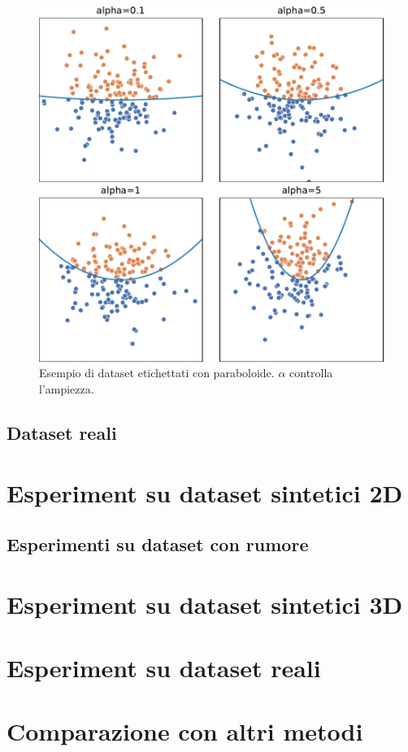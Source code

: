 \begin{figure}[ht]
    \centering
    \includegraphics[width=1\linewidth]{img/pacman_dataset_param_influence.pdf}
    \caption{Esempio di dataset etichettati con paraboloide. $\alpha$ controlla l'ampiezza.}
    \label{fig:pacman_dataset}
\end{figure}

\subsection{Dataset reali}

\section{Esperiment su dataset sintetici 2D}

\subsection{Esperimenti su dataset con rumore}

\section{Esperiment su dataset sintetici 3D}

\section{Esperiment su dataset reali}

\section{Comparazione con altri metodi}









